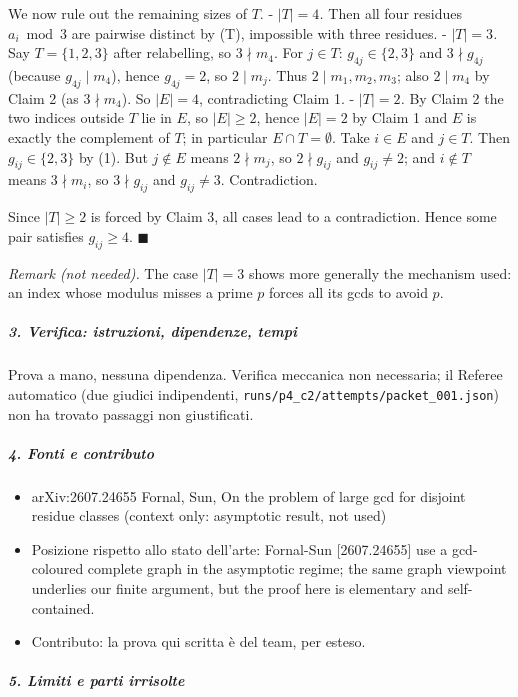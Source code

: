 \documentclass[11pt,a4paper]{article}
\providecommand{\tightlist}{\setlength{\itemsep}{0pt}\setlength{\parskip}{0pt}}
\begin{document}
We now rule out the remaining sizes of \(T\). - \emph{\(|T|=4\).} Then
all four residues \(a_i\bmod 3\) are pairwise distinct by (T),
impossible with three residues. - \emph{\(|T|=3\).} Say \(T=\{1,2,3\}\)
after relabelling, so \(3\nmid m_4\). For \(j\in T\):
\(g_{4j}\in\{2,3\}\) and \(3\nmid g_{4j}\) (because \(g_{4j}\mid m_4\)),
hence \(g_{4j}=2\), so \(2\mid m_j\). Thus \(2\mid m_1,m_2,m_3\); also
\(2\mid m_4\) by Claim 2 (as \(3\nmid m_4\)). So \(|E|=4\),
contradicting Claim 1. - \emph{\(|T|=2\).} By Claim 2 the two indices
outside \(T\) lie in \(E\), so \(|E|\ge2\), hence \(|E|=2\) by Claim 1
and \(E\) is exactly the complement of \(T\); in particular
\(E\cap T=\emptyset\). Take \(i\in E\) and \(j\in T\). Then
\(g_{ij}\in\{2,3\}\) by (1). But \(j\notin E\) means \(2\nmid m_j\), so
\(2\nmid g_{ij}\) and \(g_{ij}\ne2\); and \(i\notin T\) means
\(3\nmid m_i\), so \(3\nmid g_{ij}\) and \(g_{ij}\ne3\). Contradiction.

Since \(|T|\ge2\) is forced by Claim 3, all cases lead to a
contradiction. Hence some pair satisfies \(g_{ij}\ge4\).
\(\blacksquare\)

\emph{Remark (not needed).} The case \(|T|=3\) shows more generally the
mechanism used: an index whose modulus misses a prime \(p\) forces all
its gcds to avoid \(p\).

\subparagraph{3. Verifica: istruzioni, dipendenze,
tempi}\label{verifica-istruzioni-dipendenze-tempi}

Prova a mano, nessuna dipendenza. Verifica meccanica non necessaria; il
Referee automatico (due giudici indipendenti,
\texttt{runs/p4\_c2/attempts/packet\_001.json}) non ha trovato passaggi
non giustificati.

\subparagraph{4. Fonti e contributo}\label{fonti-e-contributo}

\begin{itemize}
\tightlist
\item
  arXiv:2607.24655 Fornal, Sun, On the problem of large gcd for disjoint
  residue classes (context only: asymptotic result, not used)
\item
  Posizione rispetto allo stato dell'arte: Fornal-Sun {[}2607.24655{]}
  use a gcd-coloured complete graph in the asymptotic regime; the same
  graph viewpoint underlies our finite argument, but the proof here is
  elementary and self-contained.
\item
  Contributo: la prova qui scritta è del team, per esteso.
\end{itemize}

\subparagraph{5. Limiti e parti
irrisolte}\label{limiti-e-parti-irrisolte}
\end{document}
